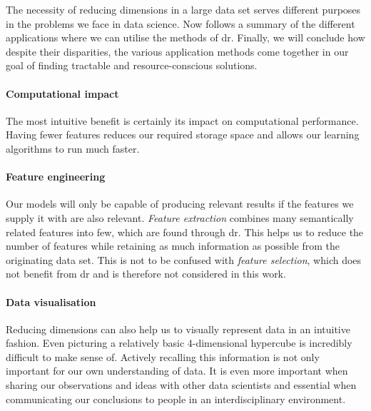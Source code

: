 The necessity of reducing dimensions in a large data set serves different purposes in the problems we face in data science. 
Now follows a summary of the different applications where we can utilise the methods of \acrlong{dr}.
Finally, we will conclude how despite their disparities, the various application methods come together in our goal of finding tractable and resource-conscious solutions.
\vspace{-5mm}

\paragraph{Computational impact}

The most intuitive benefit is certainly its impact on computational performance.
Having fewer features reduces our required storage space and allows our learning algorithms to run much faster. \cite{PythonMachineLearningCh1}
\vspace{-5mm}

\paragraph{Feature engineering}

Our models will only be capable of producing relevant results if the features we supply it with are also relevant. \cite{HandsOnMLCh1}
\emph{Feature extraction} combines many semantically related features into few, which are found through \gls{dr}.
This helps us to reduce the number of features while retaining as much information as possible from the originating data set.
This is not to be confused with \emph{feature selection}, which does not benefit from \gls{dr} and is therefore not considered in this work.
\vspace{-5mm}

\paragraph{Data visualisation}

Reducing dimensions can also help us to visually represent data in an intuitive fashion.
Even picturing a relatively basic 4-dimensional hypercube is incredibly difficult to make sense of.
Actively recalling this information is not only important for our own understanding of data. It is even more important when sharing our observations and ideas with other data scientists and essential when communicating our conclusions to people in an interdisciplinary environment. \cite{PythonMachineLearningCh5}
\vspace{-5mm}

